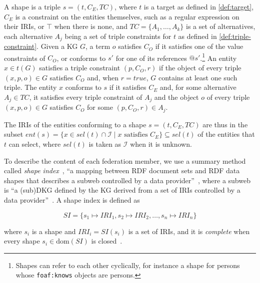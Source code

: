 \begin{definition}[Shape]\label{def:shape}
A shape is a triple $s = (t, C_E, \mathit{TC})$, where
$t$ is a target as defined in \cref{def:target},
$C_E$ is a constraint on the entities themselves, such as a regular expression on their \acp{IRI}, or $\top$ when there is none, and
$\mathit{TC} = \{A_1, \dots, A_k\}$ is a set of alternatives, each alternative $A_j$ being a set of triple constraints for $t$ as defined in \cref{def:triple-constraint}.
Given a \ac{KG} $G$, a term $o$ satisfies $C_O$ if it satisfies one of the value constraints of $C_O$, or conforms to $s'$ for one of its references $@s'$.\footnote{Shapes can refer to each other cyclically, for instance a shape for persons whose \texttt{foaf:knows} objects are persons.}
An entity $x \in t(G)$ satisfies a triple constraint $(p, C_O, r)$ if the object of every triple $(x, p, o) \in G$ satisfies $C_O$
and, when $r = \mathit{true}$, $G$ contains at least one such triple.
The entity $x$ conforms to $s$ if it satisfies $C_E$ and, for some alternative $A_j \in \mathit{TC}$, it satisfies every triple constraint of $A_j$
and the object $o$ of every triple $(x, p, o) \in G$ satisfies $C_O$ for some $(p, C_O, r) \in A_j$.
\end{definition}

The \acp{IRI} of the entities conforming to a shape $s = (t, C_E, \mathit{TC})$ are thus in the subset
$\mathit{ent}(s) = \{ x \in \mathit{sel}(t) \cap \mathcal{I} \mid x \text{ satisfies } C_E \} \subseteq \mathit{sel}(t)$
of the entities that $t$ can select, where $\mathit{sel}(t)$ is taken as $\mathcal{I}$ when it is unknown.

To describe the content of each federation member, we use a summary method called \emph{shape index}~\cite{tam2025},
``a mapping between \ac{RDF} document sets and \ac{RDF} data shapes that describes a subweb controlled by a data provider''~\cite{tam2025},
where a subweb is ``a (sub)\ac{DKG} defined by the \ac{KG} derived from a set of \acp{IRI} controlled by a data provider''~\cite{tam2025}.
A shape index is defined as

\begin{equation}\label{eq:shape-index}
  SI = \{ s_1 \mapsto \mathit{IRI}_1, s_2 \mapsto \mathit{IRI}_2, \dots, s_n \mapsto \mathit{IRI}_n \}
\end{equation}

where $s_i$ is a shape and $\mathit{IRI}_i = SI(s_i)$ is a set of \acp{IRI}, and it is \emph{complete} when every shape $s_i \in \mathrm{dom}(SI)$ is closed~\cite{tam2025}.

